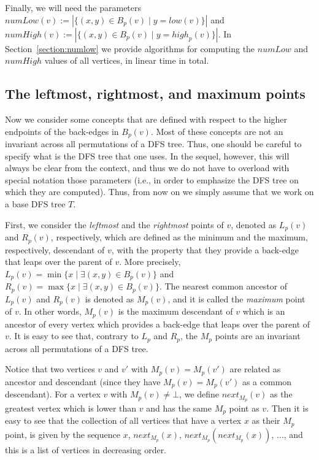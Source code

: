 \documentclass[11pt,a4paper]{article}
\begin{document}
Finally, we will need the parameters $\mathit{numLow}(v):=|\{(x,y)\in B_p(v)\mid y=\mathit{low}(v)\}|$ and $\mathit{numHigh}(v):=|\{(x,y)\in B_p(v)\mid y=\mathit{high}_p(v)\}|$. In Section~\ref{section:numlow} we provide algorithms for computing the $\mathit{numLow}$ and $\mathit{numHigh}$ values of all vertices, in linear time in total.

\subsection{The leftmost, rightmost, and maximum points}
\label{section:leftmostrightmost}
Now we consider some concepts that are defined with respect to the higher endpoints of the back-edges in $B_p(v)$. Most of these concepts are not an invariant across all permutations of a DFS tree. Thus, one should be careful to specify what is the DFS tree that one uses. In the sequel, however, this will always be clear from the context, and thus we do not have to overload with special notation those parameters (i.e., in order to emphasize the DFS tree on which they are computed). Thus, from now on we simply assume that we work on a base DFS tree $T$. 

First, we consider the \emph{leftmost} and the \emph{rightmost} points of $v$, denoted as $L_p(v)$ and $R_p(v)$, respectively, which are defined as the minimum and the maximum, respectively, descendant of $v$, with the property that they provide a back-edge that leaps over the parent of $v$. More precisely, $L_p(v)=\min\{x\mid \exists (x,y)\in B_p(v)\}$ and $R_p(v)=\max\{x\mid \exists (x,y)\in B_p(v)\}$. The nearest common ancestor of $L_p(v)$ and $R_p(v)$ is denoted as $M_p(v)$, and it is called the \emph{maximum} point of $v$. In other words, $M_p(v)$ is the maximum descendant of $v$ which is an ancestor of every vertex which provides a back-edge that leaps over the parent of $v$. It is easy to see that, contrary to $L_p$ and $R_p$, the $M_p$ points are an invariant across all permutations of a DFS tree.

Notice that two vertices $v$ and $v'$ with $M_p(v)=M_p(v')$ are related as ancestor and descendant (since they have $M_p(v)=M_p(v')$ as a common descendant). For a vertex $v$ with $M_p(v)\neq\bot$, we define $\mathit{next}_{M_p}(v)$ as the greatest vertex which is lower than $v$ and has the same $M_p$ point as $v$. Then it is easy to see that the collection of all vertices that have a vertex $x$ as their $M_p$ point, is given by the sequence $x$, $\mathit{next}_{M_p}(x)$, $\mathit{next}_{M_p}(\mathit{next}_{M_p}(x))$, $\dots$, and this is a list of vertices in decreasing order.
\end{document}
